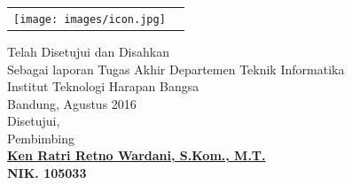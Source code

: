 \begin{center}   
\begin{tabular}{ p{4.5cm}  p{3.5cm}}
 \texttt{[image: images/icon.jpg]} &
\vspace{-4cm}{Disusun oleh:\newline Nama: xxx xxxxx\newline NIM	: xxxxxxx}

\end{tabular}
\end{center}
\doublespacing
{\center
\vspace{1cm}
Telah Disetujui dan Disahkan\\ Sebagai laporan Tugas Akhir Departemen Teknik Informatika\\
Institut Teknologi Harapan Bangsa\\[0.5cm]
Bandung,   Agustus 2016\\
Disetujui,\\[0.5cm]
Pembimbing\\[2cm]
\bfseries 
{\underline {Ken Ratri Retno Wardani, S.Kom., M.T.}\\
NIK. 105033\\}}
